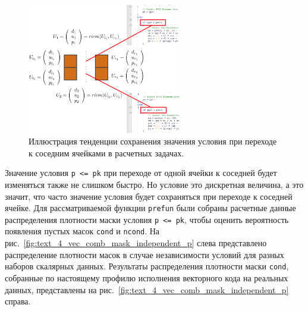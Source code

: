 \begin{figure}[ht]
\centering
\includegraphics[width=0.6\textwidth]{fig/vec_continuity.png}
\singlespacing
{}\caption{Иллюстрация тенденции сохранения значения условия при переходе к соседним ячейками в расчетных задачах.}
\label{fig:text_4_vec_comb_continuity}
\end{figure}

Значение условия \texttt{p <= pk} при переходе от одной ячейки к соседней будет изменяться также не слишком быстро.
Но условие это дискретная величина, а это значит, что часто значение условия будет сохраняться при переходе к соседней ячейке.
Для рассматриваемой функции \texttt{prefun} были собраны расчетные данные распределения плотности маски условия \texttt{p <= pk}, чтобы оценить вероятность появления пустых масок \texttt{cond} и \texttt{ncond}.
На рис.~\ref{fig:text_4_vec_comb_mask_independent_p} слева представлено распределение плотности масок в случае независимости условий для разных наборов скалярных данных.
Результаты распределения плотности маски \texttt{cond}, собранные по настоящему профилю исполнения векторного кода на реальных данных, представлены на рис.~\ref{fig:text_4_vec_comb_mask_independent_p} справа.

